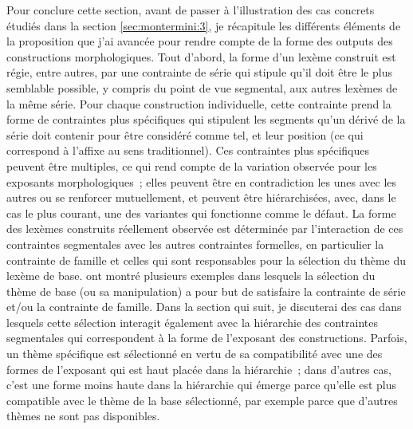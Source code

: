\documentclass[output=paper]{langsci/langscibook}
\begin{document}
Pour conclure cette section, avant de passer à l'illustration des cas
concrets étudiés dans la section \ref{sec:montermini:3}, je récapitule les différents
éléments de la proposition que j'ai avancée pour rendre compte de la
forme des outputs des constructions morphologiques. Tout d'abord, la
forme d'un lexème construit est régie, entre autres, par une contrainte
de série qui stipule qu'il doit être le plus semblable possible, y
compris du point de vue segmental, aux autres lexèmes de la même série.
Pour chaque construction individuelle, cette contrainte prend la forme
de contraintes plus spécifiques qui stipulent les segments qu'un dérivé
de la série doit contenir pour être considéré comme tel, et leur
position (ce qui correspond à l'affixe au sens traditionnel). Ces
contraintes plus spécifiques peuvent être multiples, ce qui rend compte
de la variation observée pour les exposants morphologiques~; elles
peuvent être en contradiction les unes avec les autres ou se renforcer
mutuellement, et peuvent être hiérarchisées, avec, dans le cas le plus
courant, une des variantes qui fonctionne comme le défaut. La forme des
lexèmes construits réellement observée est déterminée par l'interaction
de ces contraintes segmentales avec les autres contraintes formelles, en
particulier la contrainte de famille et celles qui sont responsables
pour la sélection du thème du lexème de base. %
\citet{Roche14} %
%
ont
montré plusieurs exemples dans lesquels la sélection du thème de base
(ou sa manipulation) a pour but de satisfaire la contrainte de série
et/ou la contrainte de famille. Dans la section qui suit, je discuterai
des cas dans lesquels cette sélection interagit également avec la
hiérarchie des contraintes segmentales qui correspondent à la forme de
l'exposant des constructions. Parfois, un thème spécifique est
sélectionné en vertu de sa compatibilité avec une des formes de
l'exposant qui est haut placée dans la hiérarchie~; dans d'autres cas,
c'est une forme moins haute dans la hiérarchie qui émerge parce qu'elle
est plus compatible avec le thème de la base sélectionné, par exemple
parce que d'autres thèmes ne sont pas disponibles.
\end{document}
